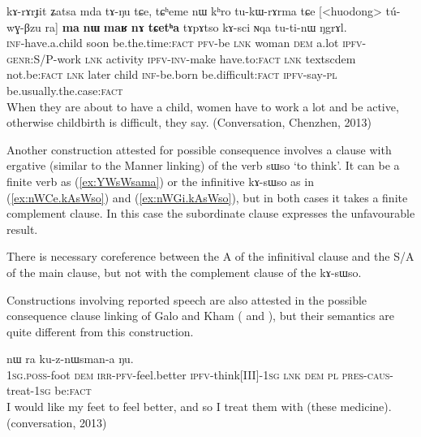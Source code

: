 \documentclass[oldfontcommands,oneside,a4paper,11pt]{article}
\newcommand{\ipa}[1]{{\phon \mbox{#1}}} %
\newcommand{\refb}[1]{(\ref{#1})}
\begin{document}
  \begin{exe}
\ex \label{ex:Zatsa.mda}
\gll 
 \ipa{kɤ-rɤrɟit}  	\ipa{ʑatsa}  	\ipa{mda}  	\ipa{tɤ-ŋu}  	\ipa{tɕe,}  	\ipa{tɕʰeme}  	\ipa{nɯ}  	\ipa{kʰro}  	\ipa{tu-kɯ-rɤrma}  	\ipa{tɕe}  	[<huodong>  	\ipa{tú-wɣ-βzu}  	\ipa{ra}]  	\ipa{\textbf{ma}}  	\ipa{\textbf{nɯ}}  	\ipa{\textbf{maʁ}}  	\ipa{\textbf{nɤ}}  	\ipa{\textbf{tɕetʰa}}  	\ipa{tɤpɤtso}  	\ipa{kɤ-sci}  	\ipa{ɴqa}  	\ipa{tu-ti-nɯ}  	\ipa{ŋgrɤl.} \\
 \textsc{inf}-have.a.child soon be.the.time:\textsc{fact}  \textsc{pfv}-be \textsc{lnk} woman \textsc{dem} a.lot \textsc{ipfv-genr}:S/P-work \textsc{lnk} activity \textsc{ipfv-inv}-make have.to:\textsc{fact} \textsc{lnk} textsc{dem} not.be:\textsc{fact} \textsc{lnk}  later
 child \textsc{inf}-be.born  be.difficult:\textsc{fact} \textsc{ipfv}-say-\textsc{pl} be.usually.the.case:\textsc{fact}  \\
 \glt When they are about to have a child, women have to work a lot and be active, otherwise   childbirth is difficult, they say. (Conversation, Chenzhen, 2013)
 \end{exe}
 
 Another construction attested for possible consequence involves a clause with ergative (similar to the Manner linking) of the verb \ipa{sɯso} `to think'. It can be a finite verb as \refb{ex:YWsWsama} or the infinitive \ipa{kɤ-sɯso} as in \refb{ex:nWCe.kAsWso} and \refb{ex:nWGi.kAsWso}, but in both cases it  takes a finite complement clause.  In this case the subordinate clause expresses the unfavourable result.
 
 There is necessary coreference between the A of the infinitival clause and the S/A of the main clause, but not with the complement clause of the  \ipa{kɤ-sɯso}. 
 
 Constructions involving reported speech are also attested in the possible consequence clause linking   of Galo and Kham  (\citealt[86, 88]{post09linking} and \citealt[110]{watters09kham}), but their semantics are quite different from this construction.
 
   \begin{exe}
\ex \label{ex:YWsWsama}
\gll 
[\ipa{a-mi}  	\ipa{nɯnɯ}  	\ipa{a-tɤ-mna}  	\ipa{ɲɯ-sɯsam-a}]  	\ipa{tɕe,}  	\ipa{nɯ} \ipa{ra}  	\ipa{ku-z-nɯsman-a}  	\ipa{ŋu.}   \\
\textsc{1sg.poss}-foot \textsc{dem} \textsc{irr-pfv}-feel.better  \textsc{ipfv}-think[III]-\textsc{1sg} \textsc{lnk} \textsc{dem} \textsc{pl} \textsc{pres-caus}-treat-\textsc{1sg}  be:\textsc{fact} \\
\glt I would like my feet to feel better, and so I treat them with (these medicine). (conversation, 2013)
  \end{exe}
 
\end{document}
